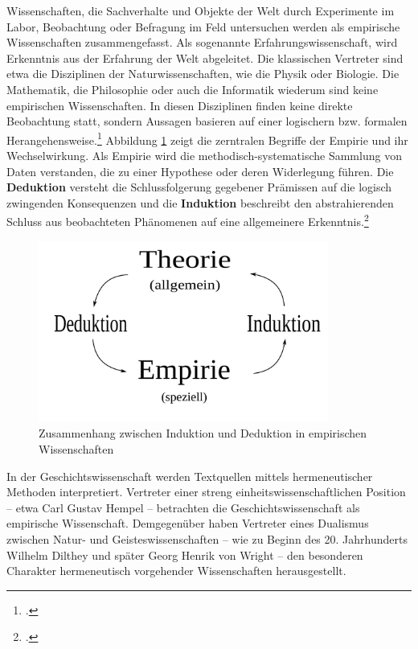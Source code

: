 \documentclass[12pt,a4paper]{article}
\begin{document}
Wissenschaften, die Sachverhalte und Objekte der Welt durch Experimente im Labor, Beobachtung oder Befragung im Feld untersuchen werden als empirische Wissenschaften zusammengefasst.  Als sogenannte Erfahrungswissenschaft, wird Erkenntnis aus der Erfahrung der Welt abgeleitet. Die klassischen Vertreter sind etwa die Disziplinen der Naturwissenschaften, wie die Physik oder Biologie. Die Mathematik, die Philosophie oder auch die Informatik wiederum sind keine empirischen Wissenschaften. In diesen Disziplinen finden keine direkte Beobachtung statt, sondern Aussagen basieren auf einer logischern bzw. formalen Herangehensweise.\footcite[08.11.2019]{frommergrundbegriffe} Abbildung \ref{fig:empirismus} zeigt die zerntralen Begriffe der Empirie und ihr Wechselwirkung. Als Empirie wird die methodisch-systematische Sammlung von Daten verstanden, die zu einer Hypothese oder deren Widerlegung führen. Die \textbf{Deduktion} versteht die Schlussfolgerung gegebener Prämissen auf die logisch zwingenden Konsequenzen und die \textbf{Induktion} beschreibt den abstrahierenden Schluss aus beobachteten Phänomenen auf eine allgemeinere Erkenntnis.\footcite[Siehe][]{chalmers2007wege}
\begin{figure}[H]
\centering
	\includegraphics[width=0.85\textwidth]{img/emprisimus.png}  
    \caption[Zusammenhang zwischen Induktion und Deduktion in empirischen Wissenschaften, \protect\url{https://de.wikipedia.org/wiki/Empirie\#/media/Datei:Induktion-Deduktion.svg}, 09.11.2019.]{Zusammenhang zwischen Induktion und Deduktion in empirischen Wissenschaften} \label{fig:empirismus}
\end{figure}
In der Geschichtswissenschaft werden Textquellen mittels hermeneutischer Methoden interpretiert.  Vertreter einer streng einheitswissenschaftlichen Position – etwa Carl Gustav Hempel – betrachten die Geschichtswissenschaft als empirische Wissenschaft. Demgegenüber haben Vertreter eines Dualismus zwischen Natur- und Geisteswissenschaften – wie zu Beginn des 20. Jahrhunderts Wilhelm Dilthey und später Georg Henrik von Wright – den besonderen Charakter hermeneutisch vorgehender Wissenschaften herausgestellt.
\end{document}
